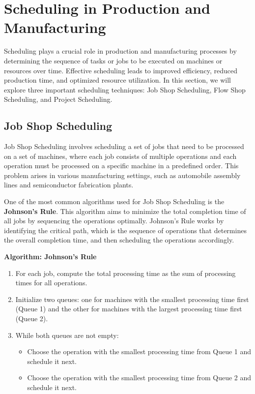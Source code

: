 \documentclass[12pt]{book} %
\begin{document}
\section{Scheduling in Production and Manufacturing}
Scheduling plays a crucial role in production and manufacturing processes by determining the sequence of tasks or jobs to be executed on machines or resources over time. Effective scheduling leads to improved efficiency, reduced production time, and optimized resource utilization. In this section, we will explore three important scheduling techniques: Job Shop Scheduling, Flow Shop Scheduling, and Project Scheduling.

\subsection{Job Shop Scheduling}
Job Shop Scheduling involves scheduling a set of jobs that need to be processed on a set of machines, where each job consists of multiple operations and each operation must be processed on a specific machine in a predefined order. This problem arises in various manufacturing settings, such as automobile assembly lines and semiconductor fabrication plants.

One of the most common algorithms used for Job Shop Scheduling is the \textbf{Johnson's Rule}. This algorithm aims to minimize the total completion time of all jobs by sequencing the operations optimally. Johnson's Rule works by identifying the critical path, which is the sequence of operations that determines the overall completion time, and then scheduling the operations accordingly.

\textbf{Algorithm: Johnson's Rule}
\begin{enumerate}
    \item For each job, compute the total processing time as the sum of processing times for all operations.
    \item Initialize two queues: one for machines with the smallest processing time first (Queue 1) and the other for machines with the largest processing time first (Queue 2).
    \item While both queues are not empty:
    \begin{itemize}
        \item Choose the operation with the smallest processing time from Queue 1 and schedule it next.
        \item Choose the operation with the smallest processing time from Queue 2 and schedule it next.
    \end{itemize}
\end{enumerate}
\end{document}
